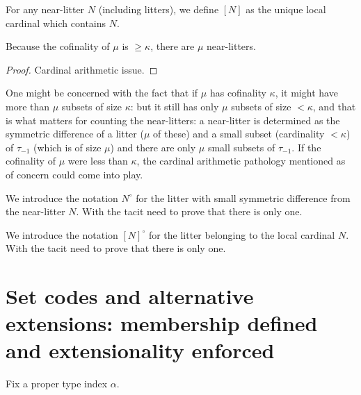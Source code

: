 \begin{definition}
\label {def:local-cardinal-of}
For any near-litter $N$ (including litters), we define $[N]$ as the unique local cardinal which contains $N$.
\end{definition}

\begin{lemma}
\label {lem:count-near-litters}

Because the cofinality of $\mu$ is $\geq \kappa$, there are $\mu$ near-litters.
\end{lemma}

\begin{proof}
Cardinal arithmetic issue.
\end{proof}

One might be concerned with the fact that if $\mu$ has cofinality $\kappa$, it might have more than $\mu$ subsets of size $\kappa$:  but it still has only $\mu$ subsets of size $<\kappa$, and that is what matters for counting the near-litters:  a near-litter is determined as the symmetric difference of a litter ($\mu$ of these) and a small subset (cardinality $<\kappa$) of $\tau_{-1}$ (which is of size $\mu$) and there are only $\mu$ small subsets of $\tau_{-1}$.  If the cofinality of $\mu$ were less than $\kappa$, the cardinal arithmetic pathology mentioned as of concern could come into play.

\begin{definition}
\label {def:the-litter-near}
We introduce the notation $N^\circ$ for the litter with small symmetric difference from the near-litter $N$.
With the tacit need to prove that there is only one.
\end{definition}

\begin{definition}
\label {def:the-litter-in}
We introduce the notation $[N]^\circ$ for the litter belonging to the local cardinal $N$.  With the tacit need to prove that there is only one.
\end{definition}

\section{Set codes and alternative extensions:  membership defined and extensionality enforced}

\begin{definition}
\label {def:alpha}
Fix a proper type index $\alpha$.
\end{definition}

